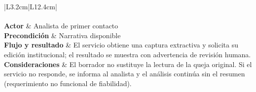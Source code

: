 \begingroup
{}
\small
\renewcommand{\arraystretch}{1.25}
\setlength{\tabcolsep}{4pt}
\begin{longtable}{|L{3.2cm}|L{12.4cm}|}
	\hline
	 \\
	\hline
	\endfirsthead
	\hline
	 \\
	\hline
	\endhead
	\textbf{Actor} & Analista de primer contacto \\ \hline
	\textbf{Precondición} & Narrativa disponible \\ \hline
	\textbf{Flujo y resultado} & El servicio obtiene una captura extractiva y solicita su edición institucional; el resultado se muestra con advertencia de revisión humana. \\ \hline
	\textbf{Consideraciones} & El borrador no sustituye la lectura de la queja original. Si el servicio no responde, se informa al analista y el análisis continúa sin el resumen (requerimiento no funcional de fiabilidad). \\ \hline
\end{longtable}
\endgroup
